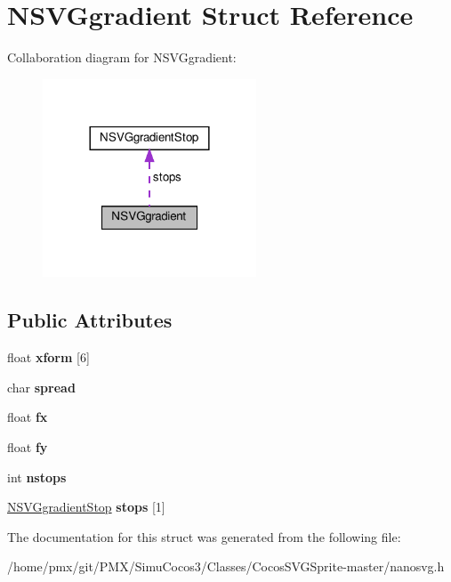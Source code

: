\hypertarget{structNSVGgradient}{}\section{N\+S\+V\+Ggradient Struct Reference}
\label{structNSVGgradient}


Collaboration diagram for N\+S\+V\+Ggradient\+:
\nopagebreak
\begin{figure}[H]
\begin{center}
\leavevmode
\includegraphics[width=180pt]{structNSVGgradient__coll__graph}
\end{center}
\end{figure}
\subsection*{Public Attributes}
\begin{DoxyCompactItemize}
\item 
\mbox{\label{structNSVGgradient_a4f4ba019cf5bbb983a0d7ceb5634c1ad}} 
float {\bfseries xform} \mbox{[}6\mbox{]}
\item 
\mbox{\label{structNSVGgradient_ad0ca9ce76308864dbb28c25a9746ec78}} 
char {\bfseries spread}
\item 
\mbox{\label{structNSVGgradient_acab1f454612d5c1b7842829fe53b3765}} 
float {\bfseries fx}
\item 
\mbox{\label{structNSVGgradient_a2a2ba27a56ad6eb78c494cdae665247a}} 
float {\bfseries fy}
\item 
\mbox{\label{structNSVGgradient_ac9e36f37d0cb087a0e599d966956f212}} 
int {\bfseries nstops}
\item 
\mbox{\label{structNSVGgradient_a54816eaf2984f175a4593a3cf70493ab}} 
\hyperlink{structNSVGgradientStop}{N\+S\+V\+Ggradient\+Stop} {\bfseries stops} \mbox{[}1\mbox{]}
\end{DoxyCompactItemize}


The documentation for this struct was generated from the following file\+:\begin{DoxyCompactItemize}
\item 
/home/pmx/git/\+P\+M\+X/\+Simu\+Cocos3/\+Classes/\+Cocos\+S\+V\+G\+Sprite-\/master/nanosvg.\+h\end{DoxyCompactItemize}
